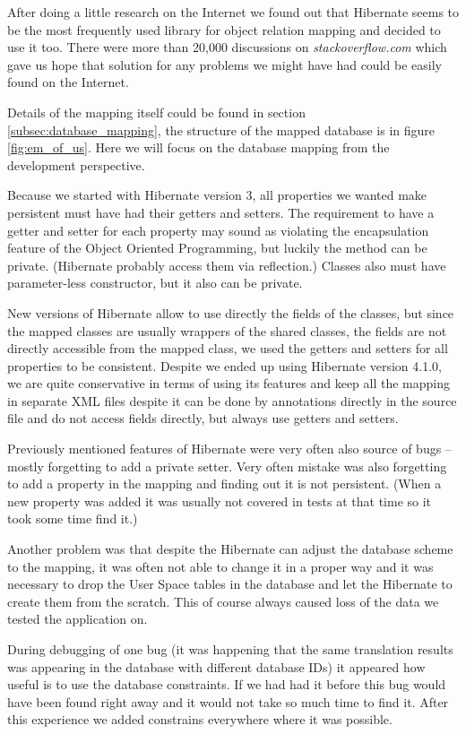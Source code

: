After doing a little research on the Internet we found out that Hibernate seems to be the most frequently used library for object relation mapping and decided to use it too. There were more than 20,000 discussions on \emph{stackoverflow.com} which gave us hope that solution for any problems we might have had could be easily found on the Internet. 

Details of the mapping itself could be found in section \ref{subsec:database_mapping}, the structure of the mapped database is in figure \ref{fig:em_of_us}. Here we will focus on the database mapping from the development perspective.

Because we started with Hibernate version 3, all properties we wanted make persistent must have had their getters and setters. The requirement to have a getter and setter for each property may sound as violating the encapsulation feature of the Object Oriented Programming, but luckily the method can be private. (Hibernate probably access them via reflection.) Classes also must have parameter-less constructor, but it also can be private.

New versions of Hibernate allow to use directly the fields of the classes, but since the mapped classes are usually wrappers of the shared classes, the fields are not directly accessible from the mapped class, we used the getters and setters for all properties to be consistent. Despite we ended up using Hibernate version 4.1.0, we are quite conservative in terms of using its features and keep all the mapping in separate XML files despite it can be done by annotations directly in the source file and do not access fields directly, but always use getters and setters.

Previously mentioned features of Hibernate were very often also source of bugs -- mostly forgetting to add a private setter. Very often mistake was also forgetting to add a property in the mapping and finding out it is not persistent. (When a new property was added it was usually not covered in tests at that time so it took some time find it.)

Another problem was that despite the Hibernate can adjust the database scheme to the mapping, it was often not able to change it in a proper way and it was necessary to drop the User Space tables in the database and let the Hibernate to create them from the scratch. This of course always caused loss of the data we tested the application on.

During debugging of one bug (it was happening that the same translation results was appearing in the database with different database IDs) it appeared how useful is to use the database constraints. If we had had it before this bug would have been found right away and it would not take so much time to find it. After this experience we added constrains everywhere where it was possible.

